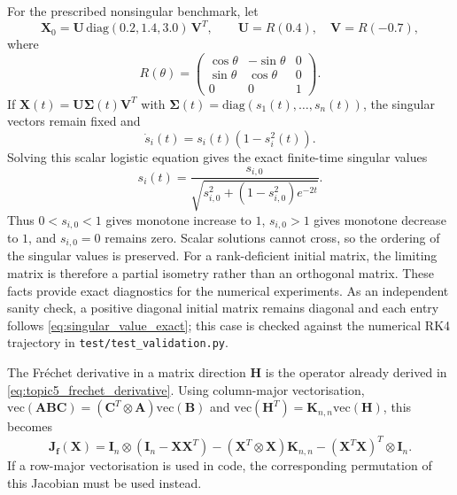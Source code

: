 \documentclass[11pt,a4paper]{article}
\theoremstyle{definition}
\theoremstyle{remark}
\begin{document}
For the prescribed nonsingular benchmark, let
\begin{equation}
\label{eq:topic5_benchmark}
\mathbf{X}_0=\mathbf{U}\,\mathrm{diag}(0.2,1.4,3.0)\,\mathbf{V}^T,
\qquad \mathbf{U}=R(0.4),\quad \mathbf{V}=R(-0.7),
\end{equation}
where
\begin{equation*}
R(\theta)=\begin{pmatrix}\cos\theta&-\sin\theta&0\\ \sin\theta&\cos\theta&0\\ 0&0&1\end{pmatrix}.
\end{equation*}
If
$\mathbf{X}(t)=\mathbf{U}\boldsymbol{\Sigma}(t)\mathbf{V}^T$ with
$\boldsymbol{\Sigma}(t)=\mathrm{diag}(s_1(t),\ldots,s_n(t))$, the singular vectors remain fixed and
\begin{equation}
\label{eq:singular_value_ode}
\dot{s}_i(t)=s_i(t)\left(1-s_i^2(t)\right).
\end{equation}
Solving this scalar logistic equation gives the exact finite-time singular values
\begin{equation}
\label{eq:singular_value_exact}
s_i(t)=\frac{s_{i,0}}{\sqrt{s_{i,0}^2+\left(1-s_{i,0}^2\right)e^{-2t}}}.
\end{equation}
Thus $0<s_{i,0}<1$ gives monotone increase to $1$, $s_{i,0}>1$ gives monotone decrease to $1$, and $s_{i,0}=0$ remains zero. Scalar solutions cannot cross, so the ordering of the singular values is preserved. For a rank-deficient initial matrix, the limiting matrix is therefore a partial isometry rather than an orthogonal matrix. These facts provide exact diagnostics for the numerical experiments. As an independent sanity check, a positive diagonal initial matrix remains diagonal and each entry follows \eqref{eq:singular_value_exact}; this case is checked against the numerical RK4 trajectory in \texttt{test/test\_validation.py}.

The Fr\'echet derivative in a matrix direction $\mathbf{H}$ is the
operator already derived in \eqref{eq:topic5_frechet_derivative}.
Using column-major vectorisation, $\mathrm{vec}(\mathbf{A}\mathbf{B}\mathbf{C})=(\mathbf{C}^T\otimes\mathbf{A})\mathrm{vec}(\mathbf{B})$ and $\mathrm{vec}(\mathbf{H}^T)=\mathbf{K}_{n,n}\mathrm{vec}(\mathbf{H})$, this becomes
\begin{equation}
\label{eq:analytic_jacobian_kron}
\mathbf{J}_{\mathbf{f}}(\mathbf{X})
=\mathbf{I}_n\otimes\left(\mathbf{I}_n-\mathbf{X}\mathbf{X}^T\right)
-\left(\mathbf{X}^T\otimes\mathbf{X}\right)\mathbf{K}_{n,n}
-\left(\mathbf{X}^T\mathbf{X}\right)^T\otimes\mathbf{I}_n.
\end{equation}
If a row-major vectorisation is used in code, the corresponding permutation of this Jacobian must be used instead.
\end{document}
